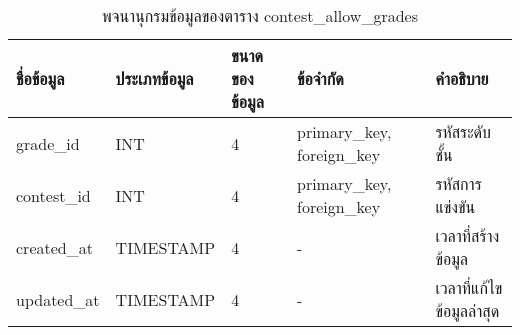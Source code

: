 \begin{table}[H]
    \caption{พจนานุกรมข้อมูลของตาราง contest\_allow\_grades}
    \label{tab:database-contest-allow_grades}
    \begin{tabularx}{\textwidth}{ | p{2.15cm} | p{2.20cm} | p{2.45cm} | p{2.15cm} | X | }
    \hline
    \textbf{ชื่อข้อมูล} & \textbf{ประเภทข้อมูล} & \textbf{ขนาดของข้อมูล} & \textbf{ข้อจำกัด} & \textbf{คำอธิบาย} \\
    \hline
    grade\_id & INT & 4 & primary\_key, foreign\_key & รหัสระดับชั้น \\
    \hline
    contest\_id & INT & 4 & primary\_key, foreign\_key & รหัสการแข่งขัน \\
    \hline
    created\_at & TIMESTAMP & 4 & - & เวลาที่สร้างข้อมูล \\
    \hline
    updated\_at & TIMESTAMP & 4 & - & เวลาที่แก้ไขข้อมูลล่าสุด \\
    \hline
    \end{tabularx}
\end{table}